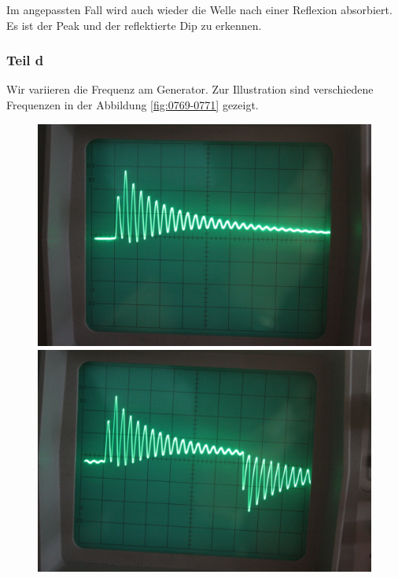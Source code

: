 Im angepassten Fall wird auch wieder die Welle nach einer Reflexion absorbiert.
Es ist der Peak und der reflektierte Dip zu erkennen.

\FloatBarrier
\subsubsection{Teil d}

Wir variieren die Frequenz am Generator. Zur Illustration sind verschiedene Frequenzen in der Abbildung \ref{fig:0769-0771} gezeigt.

\begin{figure}[htbp]
	\begin{minipage}{.3\linewidth}
			\includegraphics[width=\linewidth]{Fotos/IMG_0769-1500.jpg}
	\end{minipage}
	\hfill
	\begin{minipage}{.3\linewidth}
			\includegraphics[width=\linewidth]{Fotos/IMG_0770-1500.jpg}

\end{minipage}
\end{figure}
